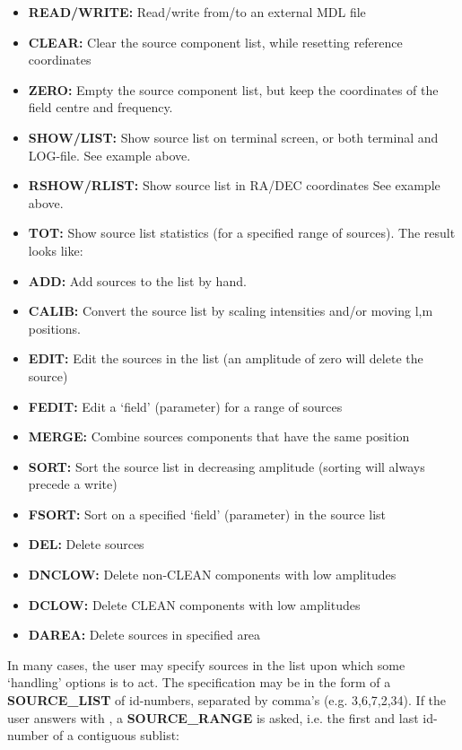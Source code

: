 \begin{itemize}
\item {\bf READ/WRITE:}		Read/write from/to an external MDL file
\item {\bf CLEAR:}		Clear the source component list, 
				while resetting reference coordinates
\item {\bf ZERO:}		Empty the source component list, 
				but keep the coordinates of the field centre
				and frequency.
\item {\bf SHOW/LIST:}		Show source list on terminal screen, 
				or both terminal and LOG-file.
				See example above.
\item {\bf RSHOW/RLIST:}	Show source list in RA/DEC coordinates
				See example above.
\item {\bf TOT:}		Show source list statistics (for a specified
				range of sources). The result looks like:
\\
\item {\bf ADD:}		Add sources to the list by hand.
\item {\bf CALIB:}		Convert the source list by scaling intensities
				and/or moving l,m positions.
\item {\bf EDIT:}		Edit the sources in the list 
				(an amplitude of zero will delete the source)
\item {\bf FEDIT:}		Edit a `field' (parameter) for a range of sources
\item {\bf MERGE:}		Combine sources components that have 
				the same position
\item {\bf SORT:}		Sort the source list in decreasing amplitude 
				(sorting will always precede a write)
\item {\bf FSORT:}		Sort on a specified `field' (parameter)
				in the source list
\item {\bf DEL:}		Delete sources
\item {\bf DNCLOW:}		Delete non-CLEAN components with low amplitudes
\item {\bf DCLOW:}		Delete CLEAN components with low amplitudes
\item {\bf DAREA:}		Delete sources in specified area
\end{itemize}

In many cases, the user may specify sources in the list upon which some
`handling' options is to act. The specification may be in the form of
a {\bf SOURCE\_LIST} of id-numbers, separated by comma's (e.g. 3,6,7,2,34).
If the user answers with \scr, a {\bf SOURCE\_RANGE} is asked,
i.e. the first and last id-number of a contiguous sublist:

